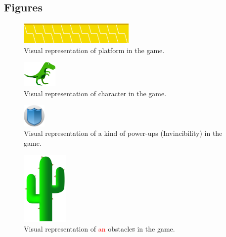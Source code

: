 \documentclass[12pt, titlepage]{article}
\begin{document}
\subsection{Figures}
\begin{figure}[!h]
    \centering
    \includegraphics[width=0.5\textwidth]{ground.png}
    \caption{Visual representation of platform in the game.}
\end{figure}
\begin{figure}[!h]
    \centering
    \includegraphics[width=0.15\textwidth]{Dino.png}
    \caption{Visual representation of character in the game.}
\end{figure}
\begin{figure}[!h]
    \centering
    \includegraphics[width=0.1\textwidth]{Power.png}
    \caption{Visual representation of a kind of power-ups (Invincibility) in the game.}
\end{figure}
\begin{figure}[!h]
    \centering
    \includegraphics[width=0.2\textwidth]{cactus.png}
     \caption{Visual representation of \textcolor{red}{an} obstacle\sout{s} in the game.}
\end{figure}
\end{document}
